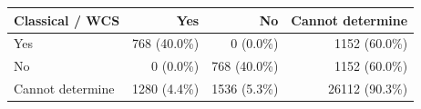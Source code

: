 \begin{tabular}{lrrr}
\toprule
Classical / WCS & Yes & No & Cannot determine \\ 
\midrule
Yes & 768 (40.0\%) & 0 (0.0\%) & 1152 (60.0\%) \\
No & 0 (0.0\%) & 768 (40.0\%) & 1152 (60.0\%) \\
Cannot determine & 1280 (4.4\%) & 1536 (5.3\%) & 26112 (90.3\%) \\
\bottomrule
\end{tabular}
